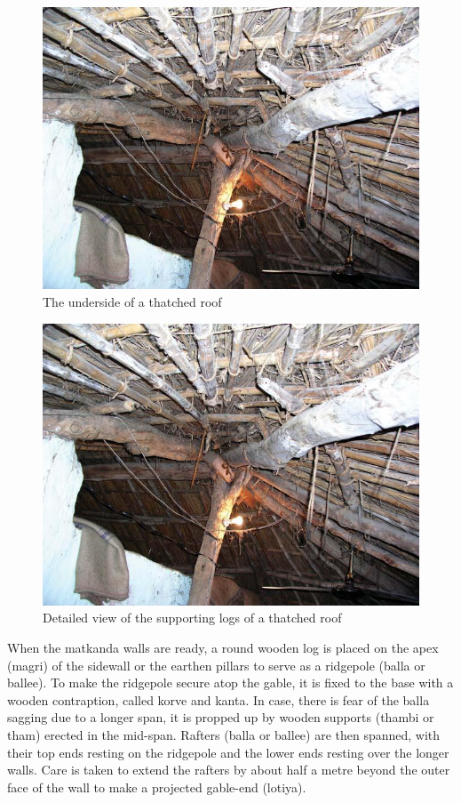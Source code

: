 \begin{figure}[!htbp]
\includegraphics[scale=.35]{images/chap02-19.jpg}
\caption{The underside of a thatched roof}\label{chap02-fig19}
\end{figure}


\begin{figure}[!htbp]
\includegraphics[scale=.35]{images/chap02-20.jpg}
\caption{Detailed view of the supporting logs of a thatched roof}\label{chap02-fig20}
\end{figure}

When the matkanda walls are ready, a round wooden log is placed on the apex (magri) of the sidewall or the earthen pillars to serve as a ridgepole (balla or ballee). To make the ridgepole secure atop the gable, it is fixed to the base with a wooden contraption, called korve and kanta. In case, there is fear of the balla sagging due to a longer span, it is propped up by wooden supports (thambi or tham) erected in the mid-span. Rafters (balla or ballee) are then spanned, with their top ends resting on the ridgepole and the lower ends resting over the longer walls. Care is taken to extend the rafters by about half a metre beyond the outer face of the wall to make a projected gable-end (lotiya).

